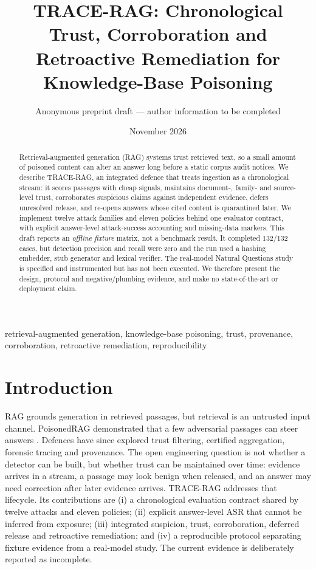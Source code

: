 \documentclass[conference]{IEEEtran}
\title{TRACE-RAG: Chronological Trust, Corroboration and Retroactive Remediation for Knowledge-Base Poisoning}
\author{Anonymous preprint draft --- author information to be completed}
\date{November 2026}
\begin{document}
\maketitle
\begin{abstract}
Retrieval-augmented generation (RAG) systems trust retrieved text, so a small
amount of poisoned content can alter an answer long before a static corpus
audit notices. We describe TRACE-RAG, an integrated defence that treats
ingestion as a chronological stream: it scores passages with cheap signals,
maintains document-, family- and source-level trust, corroborates suspicious
claims against independent evidence, defers unresolved release, and re-opens
answers whose cited content is quarantined later. We implement twelve attack
families and eleven policies behind one evaluator contract, with explicit
answer-level attack-success accounting and missing-data markers. This draft
reports an \emph{offline fixture} matrix, not a benchmark result. It completed
132/132 cases, but detection precision and recall were zero and the run used a
hashing embedder, stub generator and lexical verifier. The real-model Natural
Questions study is specified and instrumented but has not been executed. We
therefore present the design, protocol and negative/plumbing evidence, and make
no state-of-the-art or deployment claim.
\end{abstract}
\begin{IEEEkeywords}
retrieval-augmented generation, knowledge-base poisoning, trust, provenance,
corroboration, retroactive remediation, reproducibility
\end{IEEEkeywords}
\section{Introduction}
RAG grounds generation in retrieved passages, but retrieval is an untrusted
input channel. PoisonedRAG demonstrated that a few adversarial passages can
steer answers \cite{poisonedrag}. Defences have since explored trust filtering,
certified aggregation, forensic tracing and provenance. The open engineering
question is not whether a detector can be built, but whether trust can be
maintained over time: evidence arrives in a stream, a passage may look benign
when released, and an answer may need correction after later evidence arrives.
TRACE-RAG addresses that lifecycle. Its contributions are (i) a chronological
evaluation contract shared by twelve attacks and eleven policies; (ii) explicit
answer-level ASR that cannot be inferred from exposure; (iii) integrated
suspicion, trust, corroboration, deferred release and retroactive remediation;
and (iv) a reproducible protocol separating fixture evidence from a real-model
study. The current evidence is deliberately reported as incomplete.
\end{document}
